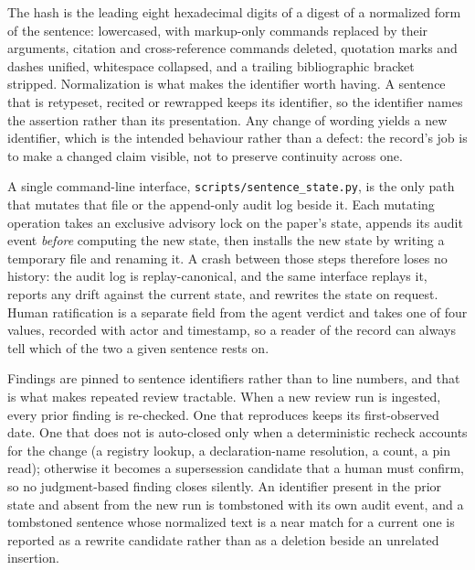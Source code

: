 \documentclass[11pt]{article}
\begin{document}
The hash is the leading eight hexadecimal digits of a digest of a
normalized form of the sentence: lowercased, with markup-only
commands replaced by their arguments, citation and cross-reference
commands deleted, quotation marks and dashes unified, whitespace
collapsed, and a trailing bibliographic bracket stripped.
Normalization is what makes the identifier worth having. A sentence
that is retypeset, recited or rewrapped keeps its identifier, so the
identifier names the assertion rather than its presentation. Any
change of wording yields a new identifier, which is the intended
behaviour rather than a defect: the record's job is to make a changed
claim visible, not to preserve continuity across one.

A single command-line interface,
\texttt{scripts/sentence\_state.py}, is the only path that mutates
that file or the append-only audit log beside it.
Each mutating operation takes an exclusive advisory lock on the
paper's state, appends its audit event \emph{before} computing the
new state, then installs the new state by writing a temporary file
and renaming it. A crash between those steps therefore loses no
history: the audit log is replay-canonical, and the same interface
replays it, reports any drift against the current state, and rewrites
the state on request. Human ratification is a separate field from the
agent verdict and takes one of four values, recorded with actor and
timestamp, so a reader of the record can always tell which of the two
a given sentence rests on.

Findings are pinned to sentence identifiers rather than to line
numbers, and that is what makes repeated review tractable. When a new
review run is ingested, every prior finding is re-checked. One that
reproduces keeps its first-observed date. One that does not is
auto-closed only when a deterministic recheck accounts for the change
(a registry lookup, a declaration-name resolution, a count, a pin
read); otherwise it becomes a supersession candidate that a human
must confirm, so no judgment-based finding closes silently. An
identifier present in the prior state and absent from the new run is
tombstoned with its own audit event, and a tombstoned sentence whose
normalized text is a near match for a current one is reported as a
rewrite candidate rather than as a deletion beside an unrelated
insertion.
\end{document}

